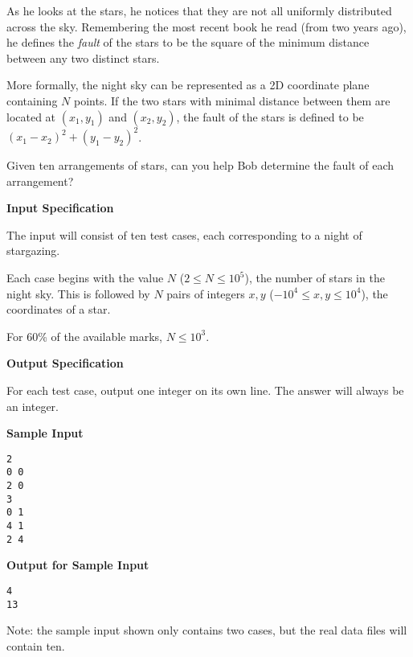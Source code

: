 \documentclass[11pt]{article}
\newcommand{\heading}[1]{\vspace{0.6em} \textbf{#1}}
\begin{document}
As he looks at the stars, he notices that they are not all uniformly distributed across the sky. Remembering the most recent book he read (from two years ago), he defines the \textit{fault} of the stars to be the square of the minimum distance between any two distinct stars.

More formally, the night sky can be represented as a 2D coordinate plane containing $N$ points. If the two stars with minimal distance between them are located at $(x_1, y_1)$ and $(x_2, y_2)$, the fault of the stars is defined to be $(x_1 - x_2)^2 + (y_1 - y_2)^2$.

Given ten arrangements of stars, can you help Bob determine the fault of each arrangement?


\heading{Input Specification}

The input will consist of ten test cases, each corresponding to a night of stargazing.

Each case begins with the value $N$ ($2 \le N \le 10^5$), the number of stars in the night sky. This is followed by $N$ pairs of integers $x, y$ ($-10^4 \le x, y \le 10^4$), the coordinates of a star.

For 60\% of the available marks, $N \le 10^3$.


\heading{Output Specification}

For each test case, output one integer on its own line. The answer will always be an integer.


\heading{Sample Input}
\vspace{-\topsep}
\begin{verbatim}
2
0 0
2 0
3
0 1
4 1
2 4
\end{verbatim}

\heading{Output for Sample Input}
\vspace{-\topsep}
\begin{verbatim}
4
13
\end{verbatim}

Note: the sample input shown only contains two cases, but the real data files will contain ten.

\end{document}

